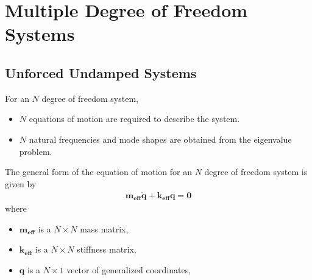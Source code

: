 \section{Multiple Degree of Freedom Systems}
\subsection{Unforced Undamped Systems}
For an $N$ degree of freedom system, 
\begin{itemize}
    \item $N$ equations of motion are required to describe the system.
    \item $N$ natural frequencies and mode shapes are obtained from the eigenvalue problem.
\end{itemize}
The general form of the equation of motion for an $N$ degree of freedom system is given by
\begin{align*}
    \mathbf{m_{\textbf{eff}}} \mathbf{\ddot{q}} + \mathbf{k_{\textbf{eff}}} \mathbf{q} = \mathbf{0}
\end{align*}
where 
\begin{itemize}
    \item $\mathbf{m_{\textbf{eff}}}$ is a $N \times N$ mass matrix,
    \item $\mathbf{k_{\textbf{eff}}}$ is a $N \times N$ stiffness matrix,
    \item $\mathbf{q}$ is a $N \times 1$ vector of generalized coordinates,
\end{itemize}

